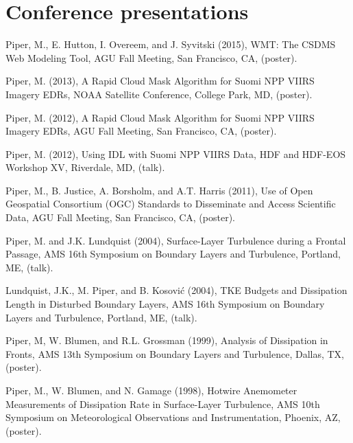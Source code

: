 \documentclass[letterpaper]{resume}
\begin{document}

\section{Conference presentations}

\vspace{1.0em}
\begin{enumerate}[{[}1{]}]

  \item Piper, M., E. Hutton, I. Overeem, and J. Syvitski (2015),
    {WMT}: The {CSDMS} Web Modeling Tool, AGU Fall Meeting, San
    Francisco, CA, (poster).

  \item Piper, M. (2013), A Rapid Cloud Mask Algorithm for {Suomi}
    {NPP} {VIIRS} {Imagery} {EDRs}, NOAA Satellite Conference, College
    Park, MD, (poster).

  \item Piper, M. (2012), {A Rapid Cloud Mask Algorithm for {Suomi}
    {NPP} {VIIRS} {Imagery} {EDRs}}, AGU Fall Meeting, San Francisco,
    CA, (poster).

  \item Piper, M. (2012), {Using IDL with {Suomi} {NPP} {VIIRS} Data},
    HDF and HDF-EOS Workshop XV, Riverdale, MD, (talk).

  \item Piper, M., B. Justice, A. Borsholm, and A.T. Harris (2011),
    Use of Open Geospatial Consortium (OGC) Standards to Disseminate
    and Access Scientific Data, AGU Fall Meeting, San Francisco, CA,
    (poster).

  \item Piper, M. and J.K. Lundquist (2004), Surface-Layer Turbulence
    during a Frontal Passage, AMS 16th Symposium on Boundary Layers
    and Turbulence, Portland, ME, (talk).

  \item Lundquist, J.K., M. Piper, and B. Kosovi{\'c} (2004), TKE
    Budgets and Dissipation Length in Disturbed Boundary Layers, AMS
    16th Symposium on Boundary Layers and Turbulence, Portland, ME,
    (talk).

  \item Piper, M, W. Blumen, and R.L. Grossman (1999), Analysis
    of Dissipation in Fronts, AMS 13th Symposium on Boundary Layers
    and Turbulence, Dallas, TX, (poster).

  \item Piper, M., W. Blumen, and N. Gamage (1998), Hotwire
    Anemometer Measurements of Dissipation Rate in Surface-Layer
    Turbulence, AMS 10th Symposium on Meteorological Observations
    and Instrumentation, Phoenix, AZ, (poster).


\end{enumerate}
\end{document}
